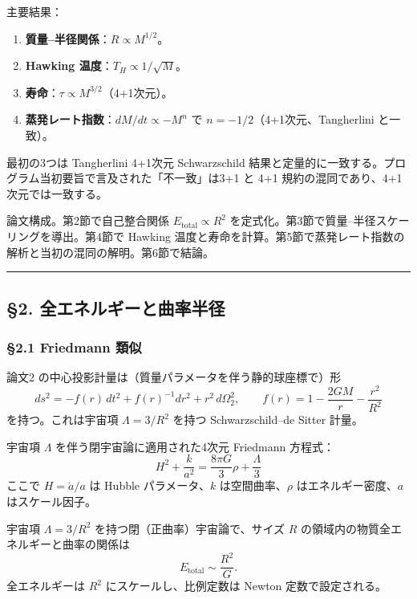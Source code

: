\documentclass[a4paper,11pt]{ltjsarticle}
\theoremstyle{definition}
\providecommand{\tightlist}{\setlength{\itemsep}{0pt}\setlength{\parskip}{0pt}}
\begin{document}
主要結果：

\begin{enumerate}
\def\labelenumi{\arabic{enumi}.}
\tightlist
\item
  \textbf{質量--半径関係}：\(R \propto M^{1/2}\)。
\item
  \textbf{Hawking 温度}：\(T_H \propto 1/\sqrt{M}\)。
\item
  \textbf{寿命}：\(\tau \propto M^{3/2}\)（4+1次元）。
\item
  \textbf{蒸発レート指数}：\(dM/dt \propto -M^{n}\) で
  \(n = -1/2\)（4+1次元、Tangherlini と一致）。
\end{enumerate}

最初の3つは Tangherlini 4+1次元 Schwarzschild
結果と定量的に一致する。プログラム当初要旨で言及された「不一致」は3+1 と
4+1 規約の混同であり、4+1次元では一致する。

論文構成。第2節で自己整合関係 \(E_{\mathrm{total}} \propto R^2\)
を定式化。第3節で質量--半径スケーリングを導出。第4節で Hawking
温度と寿命を計算。第5節で蒸発レート指数の解析と当初の混同の解明。第6節で結論。

\begin{center}\rule{0.5\linewidth}{0.5pt}\end{center}

\subsection{§2.
全エネルギーと曲率半径}\label{ux5168ux30a8ux30cdux30ebux30aeux30fcux3068ux66f2ux7387ux534aux5f84}

\subsubsection{§2.1 Friedmann 類似}\label{friedmann-ux985eux4f3c}

論文2 の中心投影計量は（質量パラメータを伴う静的球座標で）形
\[ds^2 = -f(r)\, dt^2 + f(r)^{-1} dr^2 + r^2\, d\Omega_2^2, \qquad f(r) = 1 - \frac{2GM}{r} - \frac{r^2}{R^2}\]
を持つ。これは宇宙項 \(\Lambda = 3/R^2\) を持つ Schwarzschild--de Sitter
計量。

宇宙項 \(\Lambda\) を伴う閉宇宙論に適用された4次元 Friedmann 方程式：
\[H^2 + \frac{k}{a^2} = \frac{8\pi G}{3} \rho + \frac{\Lambda}{3}\]
ここで \(H = \dot a/a\) は Hubble パラメータ、\(k\) は空間曲率、\(\rho\)
はエネルギー密度、\(a\) はスケール因子。

宇宙項 \(\Lambda = 3/R^2\) を持つ閉（正曲率）宇宙論で、サイズ \(R\)
の領域内の物質全エネルギーと曲率の関係は
\[E_{\mathrm{total}} \sim \frac{R^2}{G}.\] 全エネルギーは \(R^2\)
にスケールし、比例定数は Newton 定数で設定される。
\end{document}
